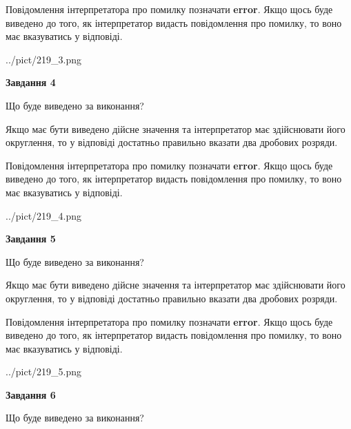 \documentclass[12pt, ukrainian]{article}
\begin{document}
{\begin {Large}
Повідомлення інтерпретатора про помилку позначати \textbf{error}.
Якщо щось буде виведено до того, як інтерпретатор видасть повідомлення про помилку, 
то воно має вказуватись у відповіді. \par

\begin{center}
	{../pict/219_3.png}
\end{center}
\newpage

{\begin {center}\textbf{Завдання 4}\end {center}}\par
Що буде виведено за виконання? \par

Якщо має бути виведено дійсне значення та інтерпретатор має здійснювати його округлення, 
то у відповіді достатньо правильно вказати два дробових розряди.

Повідомлення інтерпретатора про помилку позначати \textbf{error}.
Якщо щось буде виведено до того, як інтерпретатор видасть повідомлення про помилку, 
то воно має вказуватись у відповіді. \par

\begin{center}
	{../pict/219_4.png}
\end{center}
\newpage

{\begin {center}\textbf{Завдання 5}\end {center}}\par
Що буде виведено за виконання? \par

Якщо має бути виведено дійсне значення та інтерпретатор має здійснювати його округлення, 
то у відповіді достатньо правильно вказати два дробових розряди.

Повідомлення інтерпретатора про помилку позначати \textbf{error}.
Якщо щось буде виведено до того, як інтерпретатор видасть повідомлення про помилку, 
то воно має вказуватись у відповіді. \par

\begin{center}
	{../pict/219_5.png}
\end{center}
\newpage

{\begin {center}\textbf{Завдання 6}\end {center}}\par
Що буде виведено за виконання? \par


\end{Large}}
\end{document}

